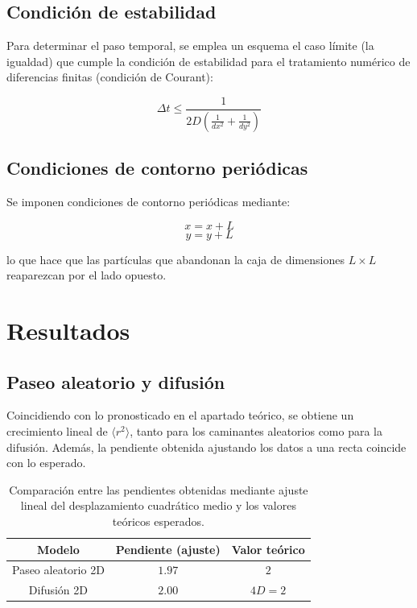 \documentclass[11pt,a4paper]{article}
\begin{document}
\subsection{Condición de estabilidad}

Para determinar el paso temporal, se emplea un esquema el caso límite (la igualdad) que cumple la condición de estabilidad para el tratamiento numérico de diferencias finitas (condición de Courant):

\begin{equation}
\Delta t \le \frac{1}{2D\left(\frac{1}{dx^2} + \frac{1}{dy^2}\right)}
\end{equation}

\subsection{Condiciones de contorno periódicas}

Se imponen condiciones de contorno periódicas mediante:

\begin{equation}
x = x + L 
\end{equation}
\begin{equation}
y = y + L 
\end{equation}

lo que hace que las partículas que abandonan la caja de dimensiones $L \times L$ reaparezcan por el lado opuesto.

\section{Resultados}

\subsection{Paseo aleatorio y difusión}

Coincidiendo con lo pronosticado en el apartado teórico, se obtiene un crecimiento lineal de $\langle r^2 \rangle$, tanto para los caminantes aleatorios como para la difusión. Además, la pendiente obtenida ajustando los datos a una recta coincide con lo esperado.

\begin{table}[H]
\centering
\begin{tabular}{|c|c|c|}
\hline
Modelo & Pendiente (ajuste) & Valor teórico \\
\hline
Paseo aleatorio 2D & $1.97$ & $2$ \\
\hline
Difusión 2D & $2.00$ & $4D = 2$ \\
\hline
\end{tabular}
\caption{Comparación entre las pendientes obtenidas mediante ajuste lineal del desplazamiento cuadrático medio y los valores teóricos esperados.}
\label{tab:msd}
\end{table}
\end{document}
